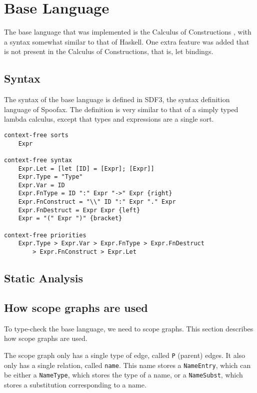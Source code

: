 
\chapter{\label{chap:baselang}Base Language}

The base language that was implemented is the Calculus of Constructions \autocite{Coquand_Huet_1988}, with a syntax somewhat similar to that of Haskell. One extra feature was added that is not present in the Calculus of Constructions, that is, let bindings.

\section{Syntax}

The syntax of the base language is defined in SDF3, the syntax definition language of Spoofax. The definition is very similar to that of a simply typed lambda calculus, except that types and expressions are a single sort. 

\begin{lstlisting}
context-free sorts
	Expr
	
context-free syntax
	Expr.Let = [let [ID] = [Expr]; [Expr]]
	Expr.Type = "Type"
	Expr.Var = ID
	Expr.FnType = ID ":" Expr "->" Expr {right}
	Expr.FnConstruct = "\\" ID ":" Expr "." Expr
	Expr.FnDestruct = Expr Expr {left}
	Expr = "(" Expr ")" {bracket}

context-free priorities
	Expr.Type > Expr.Var > Expr.FnType > Expr.FnDestruct 
		> Expr.FnConstruct > Expr.Let
\end{lstlisting}

\section{Static Analysis}


\section{How scope graphs are used}

To type-check the base language, we need to scope graphs. This section describes how scope graphs are used.

The scope graph only has a single type of edge, called \verb|P| (parent) edges. It also only has a single relation, called \verb|name|. This name stores a \verb|NameEntry|, which can be either a \verb|NameType|, which stores the type of a name, or a \verb|NameSubst|, which stores a substitution corresponding to a name. 

